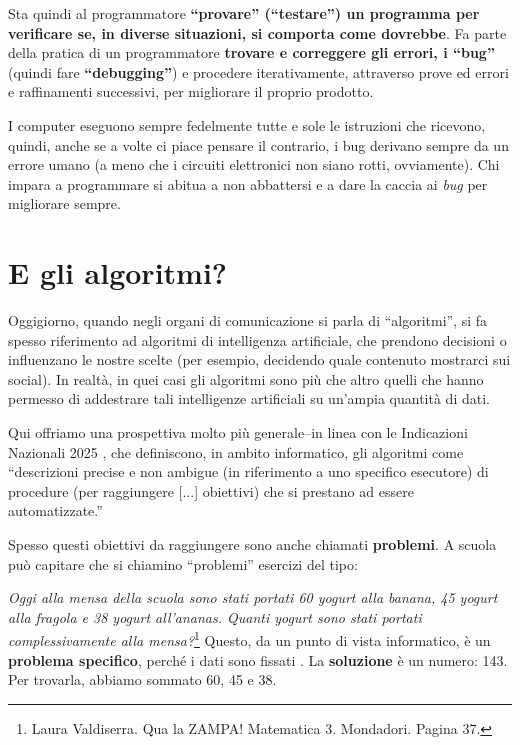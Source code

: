Sta quindi al programmatore \textbf{``provare'' (``testare'') un programma per verificare se, in diverse situazioni, si comporta come dovrebbe}. Fa parte della pratica di un programmatore \textbf{trovare e correggere gli errori, i ``bug''} (quindi fare \textbf{``debugging''}) e procedere iterativamente, attraverso prove ed errori e raffinamenti successivi, per migliorare il proprio prodotto.

I computer eseguono sempre fedelmente tutte e sole le istruzioni che ricevono, quindi, anche se a volte ci piace pensare il contrario, i bug derivano sempre da un errore umano (a meno che i circuiti elettronici non siano rotti, ovviamente). Chi impara a programmare si abitua a non abbattersi e a dare la caccia ai \emph{bug} per migliorare sempre.

\section{E gli algoritmi?}

Oggigiorno, quando negli organi di comunicazione si parla di ``algoritmi'', si fa spesso riferimento ad algoritmi di intelligenza artificiale, che prendono decisioni o influenzano le nostre scelte (per esempio, decidendo quale contenuto mostrarci sui social). In realtà, in quei casi gli algoritmi sono più che altro quelli che hanno permesso di addestrare tali intelligenze artificiali su un'ampia quantità di dati.

Qui offriamo una prospettiva molto più generale--in linea con le Indicazioni Nazionali 2025 \parencite{mim-indicazioni-2025}, che definiscono, in ambito informatico, gli algoritmi come ``descrizioni precise e non ambigue (in riferimento a uno specifico esecutore) di procedure (per raggiungere {[}...{]} obiettivi) che si prestano ad essere automatizzate.''

Spesso questi obiettivi da raggiungere sono anche chiamati \textbf{problemi}. A scuola può capitare che si chiamino ``problemi'' esercizi del tipo:

\emph{Oggi alla mensa della scuola sono stati portati 60 yogurt alla banana, 45 yogurt alla fragola e 38 yogurt all'ananas. Quanti yogurt sono stati portati complessivamente alla mensa?}\footnote{Laura Valdiserra. Qua la ZAMPA! Matematica 3. Mondadori. Pagina 37.} Questo, da un punto di vista informatico, è un \textbf{problema specifico}, perché i dati sono fissati \parencite{crippa-etal-2025}. La \textbf{soluzione} è un numero: 143. Per trovarla, abbiamo sommato 60, 45 e 38.

